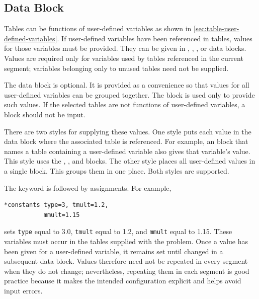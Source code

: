 \subsection{ Data Block}\label{sec:block-constants}

Tables can be functions of user-defined variables as shown in
\cref{sec:table-user-defined-variables}. If user-defined variables have been referenced
in tables, values for those variables must be provided. They can be given in
, , , or
 data blocks. Values are required only for variables used
by tables referenced in the current segment; variables belonging only to unused
tables need not be supplied.

The  data block is optional. It is provided as a
convenience so that values for all user-defined variables can be grouped together.
The block is used only to provide such values. If the selected tables are not
functions of user-defined variables, a  block should not
be input.

There are two styles for supplying these values. One style puts each value in the
data block where the associated table is referenced. For example, an
 block that names a table containing a user-defined variable
also gives that variable's value. This style uses the ,
, and  blocks. The other style places all
user-defined values in a single  block. This groups them
in one place. Both styles are supported.

The keyword is followed by assignments. For example,

\begin{lstlisting}[style=taosmanual]
*constants type=3, tmult=1.2,
           mmult=1.15
\end{lstlisting}

sets \texttt{type} equal to 3.0, \texttt{tmult} equal to 1.2, and \texttt{mmult}
equal to 1.15. These variables must occur in the tables supplied with the problem.
Once a value has been given for a user-defined variable, it remains set until changed
in a subsequent data block. Values therefore need not be repeated in every segment
when they do not change; nevertheless, repeating them in each segment is good
practice because it makes the intended configuration explicit and helps avoid input
errors.
